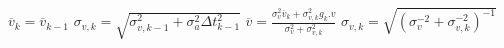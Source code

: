 \begin{algorithm}
{\begin{minipage}{\textwidth}
\begin{algorithmic}[1]
        \State $\overline{v}_{k}=\overline{v}_{k-1}$ 
        \State $\sigma_{v,k}=\sqrt{\sigma^2_{v,k-1}+ \sigma^2_{a}\Delta t^2_{k-1}}$
        \State $\overline{v} = \frac{\sigma_v^2 \overline{v}_{k}+\sigma^2_{v,k} g_k.v} {\sigma_v^2+\sigma_{v,k}^2}$
        \State $\sigma_{v,k} =\sqrt{(\sigma^{-2}_v + \sigma^{-2}_{v,k})^{-1}}$
    \EndProcedure
\end{algorithmic}
\end{minipage}%
}
\end{algorithm}



